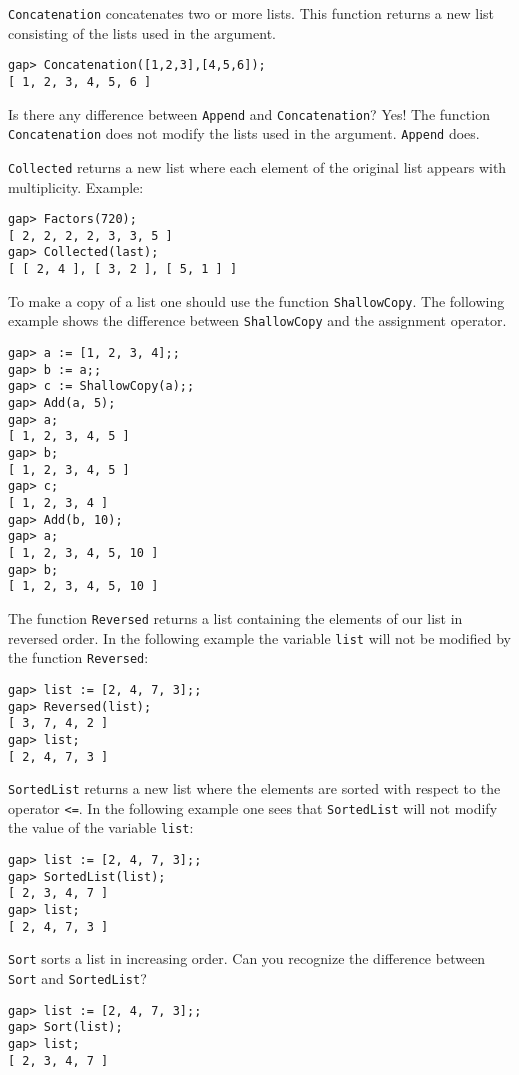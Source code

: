 \lstinline{Concatenation} concatenates two or more lists. This function returns a new list 
consisting of the lists used in the argument. 
\begin{lstlisting}
gap> Concatenation([1,2,3],[4,5,6]);
[ 1, 2, 3, 4, 5, 6 ]
\end{lstlisting}

\begin{remark}
  Is there any difference between \lstinline{Append} and
  \lstinline{Concatenation}? Yes!  The function \lstinline{Concatenation} does
  not modify the lists used in the argument. \lstinline{Append} does.
\end{remark}


\lstinline{Collected} returns a new list where each element 
of the original list appears with multiplicity. 
Example: 
\begin{lstlisting}
gap> Factors(720);
[ 2, 2, 2, 2, 3, 3, 5 ]
gap> Collected(last);
[ [ 2, 4 ], [ 3, 2 ], [ 5, 1 ] ]
\end{lstlisting}

To make a copy of a list one should use the function \lstinline{ShallowCopy}.
The following example shows the difference between \lstinline{ShallowCopy} and
the assignment operator. 
\begin{lstlisting}
gap> a := [1, 2, 3, 4];;
gap> b := a;;
gap> c := ShallowCopy(a);;
gap> Add(a, 5);
gap> a;
[ 1, 2, 3, 4, 5 ]
gap> b;
[ 1, 2, 3, 4, 5 ]
gap> c;
[ 1, 2, 3, 4 ]
gap> Add(b, 10);
gap> a;
[ 1, 2, 3, 4, 5, 10 ]
gap> b;
[ 1, 2, 3, 4, 5, 10 ]
\end{lstlisting}

The function \lstinline{Reversed} returns a list
containing the elements of our list in reversed order. 
In the following example 
the variable \lstinline{list} will not be modified by the function \lstinline{Reversed}:
\begin{lstlisting}
gap> list := [2, 4, 7, 3];;
gap> Reversed(list);
[ 3, 7, 4, 2 ]
gap> list;
[ 2, 4, 7, 3 ]
\end{lstlisting}
\lstinline{SortedList} returns a new list where the elements are sorted with
respect to the operator \lstinline{<=}. In the following example one sees that
\lstinline{SortedList} will not modify the value of the variable
\lstinline{list}:
\begin{lstlisting}
gap> list := [2, 4, 7, 3];;
gap> SortedList(list);
[ 2, 3, 4, 7 ]
gap> list;
[ 2, 4, 7, 3 ]
\end{lstlisting}
\lstinline{Sort} sorts a list in increasing order. Can you recognize the
difference between \lstinline{Sort} and \lstinline{SortedList}?
\begin{lstlisting}
gap> list := [2, 4, 7, 3];;
gap> Sort(list);
gap> list;
[ 2, 3, 4, 7 ]
\end{lstlisting}


